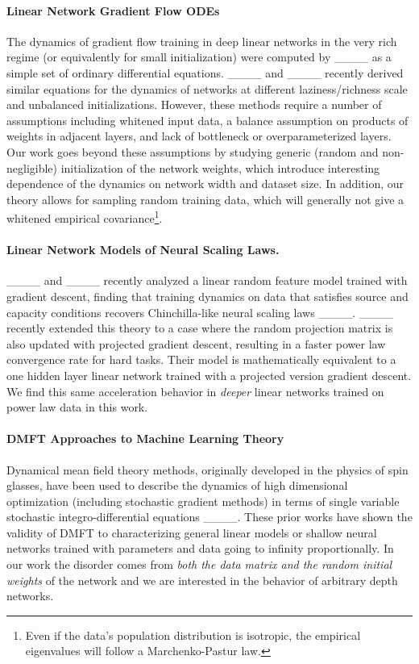 \paragraph{Linear Network Gradient Flow ODEs} The dynamics of gradient flow training in deep linear networks in the very rich regime (or equivalently for small initialization) were computed by ____ as a simple set of ordinary differential equations.  ____ and ____ recently derived similar equations for the dynamics of networks at different laziness/richness scale and unbalanced initializations. However, these methods require a number of assumptions including whitened input data, a balance assumption on products of weights in adjacent layers, and lack of bottleneck or overparameterized layers. Our work goes beyond these assumptions by studying generic (random and non-negligible) initialization of the network weights, which introduce interesting dependence of the dynamics on network width and dataset size. In addition, our theory allows for sampling random training data, which will generally not give a whitened empirical covariance\footnote{Even if the data's population distribution is isotropic, the empirical eigenvalues will follow a Marchenko-Pastur law.}. 

\vspace{-10pt}
\paragraph{Linear Network Models of Neural Scaling Laws.} ____ and ____ recently analyzed a linear random feature model trained with gradient descent, finding that training dynamics on data that satisfies source and capacity conditions recovers Chinchilla-like neural scaling laws ____. ____ recently extended this theory to a case where the random projection matrix is also updated with projected gradient descent, resulting in a faster power law convergence rate for hard tasks. Their model is mathematically equivalent to a one hidden layer linear network trained with a projected version gradient descent. We find this same acceleration behavior in \textit{deeper} linear networks trained on power law data in this work.  

\vspace{-10pt}
\paragraph{DMFT Approaches to Machine Learning Theory} 
Dynamical mean field theory methods, originally developed in the physics of spin glasses, have been used to describe the dynamics of high dimensional optimization (including stochastic gradient methods) in terms of single variable stochastic integro-differential equations ____. These prior works have shown the validity of DMFT to characterizing general linear models or shallow neural networks trained with parameters and data going to infinity proportionally. In our work the disorder comes from \textit{both the data matrix and the random initial weights} of the network and we are interested in the behavior of arbitrary depth networks. 

\vspace{-10pt}